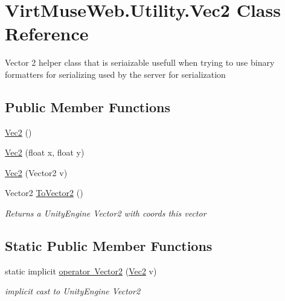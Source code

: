 \hypertarget{class_virt_muse_web_1_1_utility_1_1_vec2}{}\section{Virt\+Muse\+Web.\+Utility.\+Vec2 Class Reference}
\label{class_virt_muse_web_1_1_utility_1_1_vec2}


Vector 2 helper class that is seriaizable usefull when trying to use binary formatters for serializing used by the server for serialization  


\subsection*{Public Member Functions}
\begin{DoxyCompactItemize}
\item 
\mbox{\hyperlink{class_virt_muse_web_1_1_utility_1_1_vec2_af196c02ce65aa026434e1d95aa7cc0f1}{Vec2}} ()
\item 
\mbox{\hyperlink{class_virt_muse_web_1_1_utility_1_1_vec2_af19c7fb268d048f98483f1cba35a6b9c}{Vec2}} (float x, float y)
\item 
\mbox{\hyperlink{class_virt_muse_web_1_1_utility_1_1_vec2_a1367b81b0ecae3dae49a9aebf32e23dd}{Vec2}} (Vector2 v)
\item 
Vector2 \mbox{\hyperlink{class_virt_muse_web_1_1_utility_1_1_vec2_adf9d148c0badd947b5655efbc24f560e}{To\+Vector2}} ()
\begin{DoxyCompactList}\small\item\em Returns a Unity\+Engine Vector2 with coords this vector \end{DoxyCompactList}\end{DoxyCompactItemize}
\subsection*{Static Public Member Functions}
\begin{DoxyCompactItemize}
\item 
static implicit \mbox{\hyperlink{class_virt_muse_web_1_1_utility_1_1_vec2_ae7eea094143341c9797862761fd1b6d9}{operator Vector2}} (\mbox{\hyperlink{class_virt_muse_web_1_1_utility_1_1_vec2}{Vec2}} v)
\begin{DoxyCompactList}\small\item\em implicit cast to Unity\+Engine Vector2 \end{DoxyCompactList}\end{DoxyCompactItemize}
